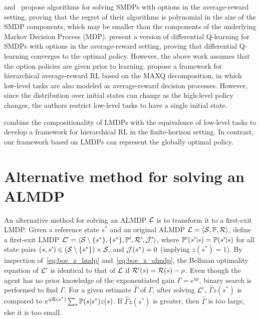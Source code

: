 \citet{Fruit2017} and~\cite{Fruit2017b} propose algorithms for solving SMDPs with options in the average-reward setting, proving that the regret of their algorithms is polynomial in the size of the SMDP components, which may be smaller than the components of the underlying Markov Decision Process (MDP).
\citet{Wan2021a} present a version of differential Q-learning for SMDPs with options in the average-reward setting, proving that differential Q-learning converges to the optimal policy.
However, the above work assumes that the option policies are given prior to learning.
\citet{Ghavamzadeh2007} propose a framework for hierarchical average-reward RL based on the MAXQ decomposition, in which low-level tasks are also modeled as average-reward decision processes.
However, since the distribution over initial states can change as the high-level policy changes, the authors restrict low-level tasks to have a single initial state.

\citet{Infante2022} combine the compositionality of LMDPs with the equivalence of low-level tasks to develop a framework for hierarchical RL in the finite-horizon setting.
In contrast, our framework based on LMDPs can represent the globally optimal policy.

\section{Alternative method for solving an ALMDP}

An alternative method for solving an ALMDP $\mathcal{L}$ is to transform it to a first-exit LMDP. 
Given a reference state $s^*$ and an original ALMDP $\mathcal{L}=\langle\mathcal{S},\mathbb{P},\mathcal{R}\rangle$, define a first-exit LMDP $\mathcal{L}'=\langle\mathcal{S}\setminus\{s^*\},\{s^*\}, \mathbb{P}',\mathcal{R}',\mathcal{J}'\rangle$, where $\mathbb{P}'(s'|s)=\mathbb{P}(s'|s)$ for all state pairs $(s,s')\in(\mathcal{S}\setminus\{s^*\})\times\mathcal{S}$, and $\mathcal{J}(s^*)=0$ (implying $z(s^*)=1$). By inspection of~\eqref{eq:boe_z_lmdp} and~\eqref{eq:boe_z_almdp}, the Bellman optimality equation of $\mathcal{L}'$ is identical to that of $\mathcal{L}$ if $\mathcal{R}'(s)=\mathcal{R}(s)-\rho$. Even though the agent has no prior knowledge of the exponentiated gain $\Gamma = e^{\eta\rho}$, binary search is performed to find $\Gamma$. For a given estimate $\hat\Gamma$ of $\Gamma$, after solving $\mathcal{L}'$, $\hat \Gamma z(s^*)$ is compared to $e^{\eta\mathcal{R}(s^*)}\sum_s\mathbb{P}(s|s^*)z(s)$. If $\hat \Gamma z(s^*)$ is greater, then $\hat\Gamma$ is too large, else it is too small.

